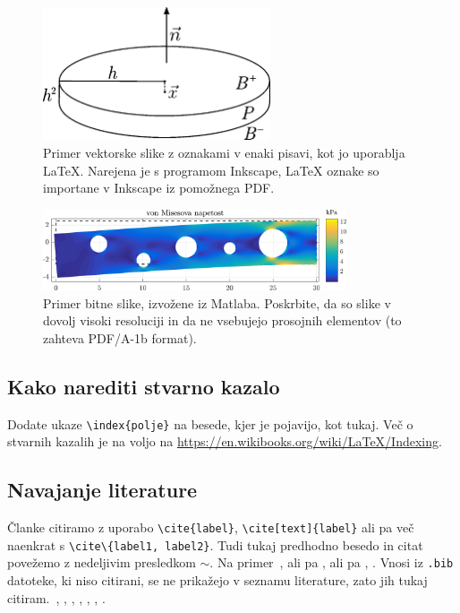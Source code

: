 \documentclass[12pt,a4paper,twoside]{article}
\theoremstyle{definition} %
\theoremstyle{plain} %
\numberwithin{equation}{section}  %
\begin{document}
\begin{figure}[h]
  \centering
  \includegraphics[width=0.6\textwidth]{images/sample.pdf}
  \caption[Primer vektorske slike.]{Primer vektorske slike z oznakami v enaki pisavi, kot jo
     uporablja \LaTeX{}.  Narejena je s programom Inkscape, \LaTeX{} oznake so importane v
     Inkscape iz pomožnega PDF.}
  \label{fig:sample}
\end{figure}

\begin{figure}[h]
  \centering
  \includegraphics[width=0.8\textwidth]{images/image.png}
  \caption[Primer bitne slike.]{Primer bitne slike, izvožene iz Matlaba. Poskrbite, da so slike v
  dovolj visoki resoluciji in da ne vsebujejo prosojnih elementov (to zahteva PDF/A-1b format).}
  \label{fig:image}
\end{figure}

\subsection{Kako narediti stvarno kazalo}
Dodate ukaze \verb|\index{polje}| na besede, kjer je pojavijo, kot tukaj.
Več o stvarnih kazalih je na voljo na \url{https://en.wikibooks.org/wiki/LaTeX/Indexing}.

\subsection{Navajanje literature}
Članke citiramo z uporabo \verb|\cite{label}|, \verb|\cite[text]{label}| ali pa več naenkrat s
\verb|\cite\{label1, label2}|. Tudi tukaj predhodno besedo in citat povežemo z nedeljivim presledkom
$\sim$. Na primer~\cite{chen2006meshless,liu2001point}, ali pa \cite{kibriya2007empirical}, ali pa
\cite[str.\ 12]{trobec2015parallel}, \cite[enačba (2.3)]{pereira2016convergence}.
Vnosi iz \verb|.bib| datoteke, ki niso citirani, se ne prikažejo v seznamu literature, zato jih
tukaj citiram.~\cite{vene2000categorical}, \cite{gregoric2017stopniceni}, \cite{slak2015induktivni},
\cite{nsphere}, \cite{kearsley1975linearly}, \cite{STtemplate}, \cite{NunbergerTand}.
\end{document}
